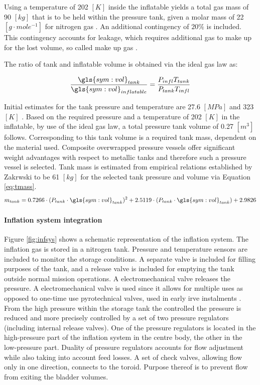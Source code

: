 Using a temperature of 202 $[K]$ inside the inflatable yields a total gas mass of 90 $[kg]$ that is to be held within the pressure tank, given a molar mass of 22 $[g\cdot mole^{-1}]$ for nitrogen gas \cite{Samareh2011}. An additional contingency of $20\%$ is included. This contingency accounts for leakage, which requires additional gas to make up for the lost volume, so called make up gas \cite{Jenkins2001}.

The ratio of tank and inflatable volume is obtained via the ideal gas law as:

\begin{equation}
\frac{\gls{sym:vol}_{tank}}{\gls{sym:vol}_{inflatable}} = \frac{P_{infl}T_{tank}}{P_{tank}T_{infl}}
\label{eq:volratio}
\end{equation}

Initial estimates for the tank pressure and temperature are 27.6 $[MPa]$ and 323 $[K]$ \cite[p.545]{Wertz2011}. Based on the required pressure and a temperature of 202 $[K]$ in the inflatable, by use of the ideal gas law, a total pressure tank volume of 0.27 $[m^{3}]$ follows. Corresponding to this tank volume is a required tank mass, dependent on the material used. Composite overwrapped pressure vessels offer significant weight advantages with respect to metallic tanks and therefore such a pressure vessel is selected. Tank mass is estimated from empirical relations established by Zakrwski \cite[p.546]{Wertz2011} to be 61 $[kg]$ for the selected tank pressure and volume via Equation \ref{eq:tmass}.
\begin{equation}
m_{tank} = 0.7266 \cdot (P_{tank} \cdot \gls{sym:vol}_{tank})^{2} + 2.5119 \cdot (P_{tank} \cdot \gls{sym:vol}_{tank}) + 2.9826
\label{eq:tmass}
\end{equation}

\paragraph{Inflation system integration}

Figure \ref{fig:infsys} shows a schematic representation of the inflation system. The inflation gas is stored in a nitrogen tank. Pressure and temperature sensors are included to monitor the storage conditions. A separate valve is included for filling purposes of the tank, and a release valve is included for emptying the tank outside normal mission operations. A electromechanical valve releases the pressure. A electromechanical valve is used since it allows for multiple uses as opposed to one-time use pyrotechnical valves, used in early \gls{irve} instalments \cite{Hughes2005}. From the high pressure within the storage tank the controlled the pressure is reduced and more precisely controlled by a set of two pressure regulators (including internal release valves). One of the pressure regulators is located in the high-pressure part of the inflation system in the centre body, the other in the low-pressure part. Duality of pressure regulators accounts for flow adjustment while also taking into account feed losses. A set of check valves, allowing flow only in one direction, connects to the toroid. Purpose thereof is to prevent flow from exiting the bladder volumes. 

